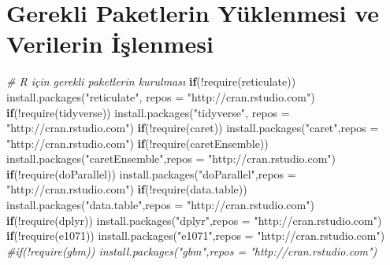 \documentclass[12pt,twoside]{deuthesis}
\newenvironment{Shaded}{\begin{snugshade}}{\end{snugshade}}
\newcommand{\AttributeTok}[1]{\textcolor[rgb]{0.77,0.63,0.00}{#1}}
\newcommand{\CommentTok}[1]{\textcolor[rgb]{0.56,0.35,0.01}{\textit{#1}}}
\newcommand{\ControlFlowTok}[1]{\textcolor[rgb]{0.13,0.29,0.53}{\textbf{#1}}}
\newcommand{\FunctionTok}[1]{\textcolor[rgb]{0.00,0.00,0.00}{#1}}
\newcommand{\NormalTok}[1]{#1}
\newcommand{\SpecialCharTok}[1]{\textcolor[rgb]{0.00,0.00,0.00}{#1}}
\newcommand{\StringTok}[1]{\textcolor[rgb]{0.31,0.60,0.02}{#1}}
\begin{document}
\hypertarget{gerekli-paketlerin-yuxfcklenmesi-ve-verilerin-iux15flenmesi}{%
\chapter{Gerekli Paketlerin Yüklenmesi ve Verilerin İşlenmesi}\label{gerekli-paketlerin-yuxfcklenmesi-ve-verilerin-iux15flenmesi}}
\begin{Shaded}
\begin{Highlighting}[]
\CommentTok{\# R için gerekli paketlerin kurulması}
\ControlFlowTok{if}\NormalTok{(}\SpecialCharTok{!}\FunctionTok{require}\NormalTok{(reticulate)) }\FunctionTok{install.packages}\NormalTok{(}\StringTok{"reticulate"}\NormalTok{, }\AttributeTok{repos =} \StringTok{"http://cran.rstudio.com"}\NormalTok{)}
\ControlFlowTok{if}\NormalTok{(}\SpecialCharTok{!}\FunctionTok{require}\NormalTok{(tidyverse)) }\FunctionTok{install.packages}\NormalTok{(}\StringTok{"tidyverse"}\NormalTok{, }\AttributeTok{repos =} \StringTok{"http://cran.rstudio.com"}\NormalTok{)}
\ControlFlowTok{if}\NormalTok{(}\SpecialCharTok{!}\FunctionTok{require}\NormalTok{(caret)) }\FunctionTok{install.packages}\NormalTok{(}\StringTok{"caret"}\NormalTok{,}\AttributeTok{repos =} \StringTok{"http://cran.rstudio.com"}\NormalTok{)}
\ControlFlowTok{if}\NormalTok{(}\SpecialCharTok{!}\FunctionTok{require}\NormalTok{(caretEnsemble))  }\FunctionTok{install.packages}\NormalTok{(}\StringTok{"caretEnsemble"}\NormalTok{,}\AttributeTok{repos =} \StringTok{"http://cran.rstudio.com"}\NormalTok{)}
\ControlFlowTok{if}\NormalTok{(}\SpecialCharTok{!}\FunctionTok{require}\NormalTok{(doParallel))  }\FunctionTok{install.packages}\NormalTok{(}\StringTok{"doParallel"}\NormalTok{,}\AttributeTok{repos =} \StringTok{"http://cran.rstudio.com"}\NormalTok{)}
\ControlFlowTok{if}\NormalTok{(}\SpecialCharTok{!}\FunctionTok{require}\NormalTok{(data.table))  }\FunctionTok{install.packages}\NormalTok{(}\StringTok{"data.table"}\NormalTok{,}\AttributeTok{repos =} \StringTok{"http://cran.rstudio.com"}\NormalTok{)}
\ControlFlowTok{if}\NormalTok{(}\SpecialCharTok{!}\FunctionTok{require}\NormalTok{(dplyr))  }\FunctionTok{install.packages}\NormalTok{(}\StringTok{"dplyr"}\NormalTok{,}\AttributeTok{repos =} \StringTok{"http://cran.rstudio.com"}\NormalTok{)}
\ControlFlowTok{if}\NormalTok{(}\SpecialCharTok{!}\FunctionTok{require}\NormalTok{(e1071))  }\FunctionTok{install.packages}\NormalTok{(}\StringTok{"e1071"}\NormalTok{,}\AttributeTok{repos =} \StringTok{"http://cran.rstudio.com"}\NormalTok{)}
\CommentTok{\#if(!require(gbm))  install.packages("gbm",repos = "http://cran.rstudio.com")}

\end{Highlighting}
\end{Shaded}
\end{document}
